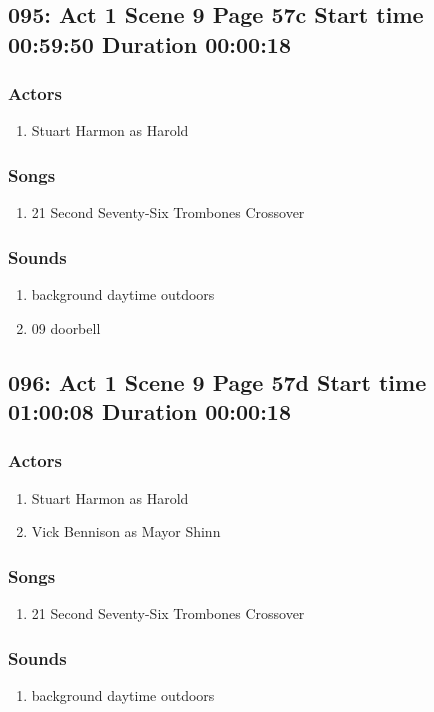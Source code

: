 \subsection{095: Act 1 Scene 9 Page 57c Start time 00:59:50 Duration 00:00:18}

\subsubsection{Actors}
\begin{enumerate}
\item Stuart Harmon as Harold
\end{enumerate}

\subsubsection{Songs}
\begin{enumerate}
\item 21 Second Seventy-Six Trombones Crossover
\end{enumerate}\subsubsection{Sounds}
\begin{enumerate}
\item background daytime outdoors
\item 09 doorbell
\end{enumerate}
\subsection{096: Act 1 Scene 9 Page 57d Start time 01:00:08 Duration 00:00:18}

\subsubsection{Actors}
\begin{enumerate}
\item Stuart Harmon as Harold
\item Vick Bennison as Mayor Shinn
\end{enumerate}

\subsubsection{Songs}
\begin{enumerate}
\item 21 Second Seventy-Six Trombones Crossover
\end{enumerate}\subsubsection{Sounds}
\begin{enumerate}
\item background daytime outdoors
\end{enumerate}
